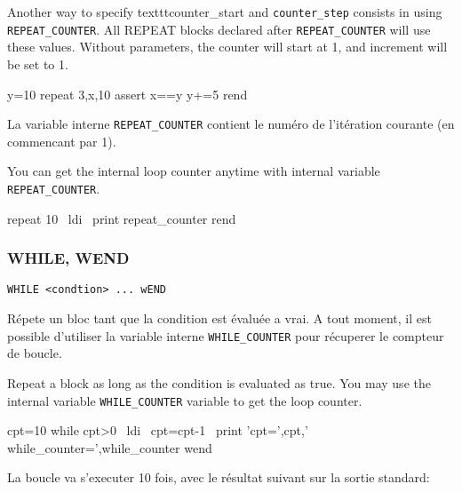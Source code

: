 \begin{xen}
Another way to specify texttt{counter\_start} and \texttt{counter\_step}  consists in using \texttt{REPEAT\_COUNTER}.
All REPEAT blocks declared after \texttt{REPEAT\_COUNTER} will use these values.
Without parameters, the counter will start at 1, and increment will be set to 1.
\end{xen}

\begin{code}
y=10
repeat 3,x,10
  assert x==y
  y+=5
rend
\end{code}
    
\begin{xfr}
La variable interne \texttt{REPEAT\_COUNTER} contient le numéro de l'itération courante (en commencant par 1).
\end{xfr}
\begin{xen}
You can get the internal loop counter anytime with internal variable \texttt{REPEAT\_COUNTER}.
\end{xen}

\begin{code}
repeat 10
\ ldi
\ print repeat\_counter
rend
\end{code}

    


\subsubsection{WHILE, WEND}
\begin{verbatim}
WHILE <condtion> ... wEND
\end{verbatim}

\begin{xfr}
Répete un bloc tant que la condition est évaluée a vrai. A tout moment, il est possible d'utiliser la variable interne \texttt{WHILE\_COUNTER} pour récuperer le compteur de boucle.
\end{xfr}

\begin{xen}
Repeat a block as long as the condition is evaluated as true. You may use the internal variable \texttt{WHILE\_COUNTER} variable to get the loop counter.
\end{xen}

\begin{code}
cpt=10
while cpt\textgreater 0
\ ldi
\ cpt=cpt-1
\ print 'cpt=',cpt,' while\_counter=',while\_counter
wend
\end{code}

\begin{xfr}
La boucle va s'executer 10 fois, avec le résultat suivant sur la sortie standard:
\end{xfr}

